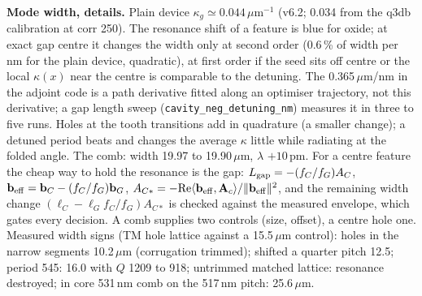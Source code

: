 \documentclass[11pt,a4paper]{article}
\begin{document}
\textbf{Mode width, details.} Plain device $\kappa_g\simeq0.044$\,$\mu$m$^{-1}$ (v6.2; 0.034 from the q3db
calibration at corr 250). The resonance shift of a feature is blue for oxide; at exact gap centre it changes the
width only at second order (0.6\,\% of width per nm for the plain device, quadratic), at first order if the seed
sits off centre or the local $\kappa(x)$ near the centre is comparable to the detuning. The 0.365\,$\mu$m/nm in
the adjoint code is a path derivative fitted along an optimiser trajectory, not this derivative; a gap length
sweep (\texttt{cavity\_neg\_detuning\_nm}) measures it in three to five runs. Holes at the tooth transitions add
in quadrature (a smaller change); a detuned period beats and changes the average $\kappa$ little while radiating
at the folded angle. The comb: width 19.97 to 19.90\,$\mu$m, $\lambda$ $+10$\,pm. For a centre feature the cheap
way to hold the resonance is the gap: $L_{\rm gap}=-(f_C/f_G)A_C$,
$\mathbf b_{\rm eff}=\mathbf b_C-(f_C/f_G)\mathbf b_G$,
$A_{C*}=-\mathrm{Re}\langle\mathbf b_{\rm eff},\mathbf A_c\rangle/\|\mathbf b_{\rm eff}\|^2$, and the remaining
width change $(\ell_C-\ell_Gf_C/f_G)A_{C*}$ is checked against the measured envelope, which gates every decision.
A comb supplies two controls (size, offset), a centre hole one. Measured width signs (TM hole lattice against a
15.5\,$\mu$m control): holes in the narrow segments 10.2\,$\mu$m (corrugation trimmed); shifted a quarter pitch
12.5; period 545: 16.0 with $Q$ 1209 to 918; untrimmed matched lattice: resonance destroyed; in core 531\,nm comb
on the 517\,nm pitch: 25.6\,$\mu$m.
\end{document}
